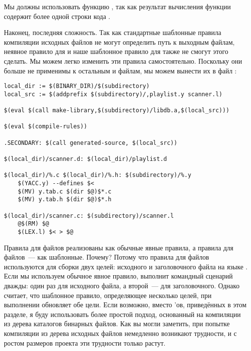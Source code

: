 Мы должны использовать функцию , так как результат
вычисления функции  содержит более одной
строки кода \GNUmake{}.

Наконец, последняя сложность. Так как стандартные шаблонные правила
компиляции исходных файлов \Clang{} не могут определить путь к
выходным файлам, неявное правило для  и наше шаблонное
правило для  также не смогут этого сделать. Мы можем
легко изменить эти правила самостоятельно. Поскольку они больше не
применимы к остальным  и  файлам, мы можем
вынести их в файл :

{\footnotesize
\begin{verbatim}
local_dir := $(BINARY_DIR)/$(subdirectory)
local_src := $(addprefix $(subdirectory)/,playlist.y scanner.l)

$(eval $(call make-library,$(subdirectory)/libdb.a,$(local_src)))

$(eval $(compile-rules))

.SECONDARY: $(call generated-source, $(local_src))

$(local_dir)/scanner.d: $(local_dir)/playlist.d

$(local_dir)/%.c $(local_dir)/%.h: $(subdirectory)/%.y
    $(YACC.y) --defines $<
    $(MV) y.tab.c $(dir $@)$*.c
    $(MV) y.tab.h $(dir $@)$*.h

$(local_dir)/scanner.c: $(subdirectory)/scanner.l
    @$(RM) $@
    $(LEX.l) $< > $@
\end{verbatim}
}

Правила для  файлов реализованы как обычные явные
правила, а правила для  файлов~--- как шаблонные.
Почему? Потому что правила для  файлов используются для
сборки двух целей: исходного и заголовочного файла на языке \Clang{}.
Если мы используем обычное явное правило, \GNUmake{} выполнит
командный сценарий дважды: один раз для исходного файла, а второй~---
для заголовочного. Однако \GNUmake{} считает, что шаблонное правило,
определяющее несколько целей, при выполнении обновляет обе цели.  Если
возможно, вместо \Makefile{}'ов, приведённых в этом разделе, я буду
использовать более простой подход, основанный на компиляции из дерева
каталогов бинарных файлов. Как вы могли заметить, при попытке
компиляции из дерева исходных файлов немедленно возникают трудности, и
с ростом размеров проекта эти трудности только растут.
